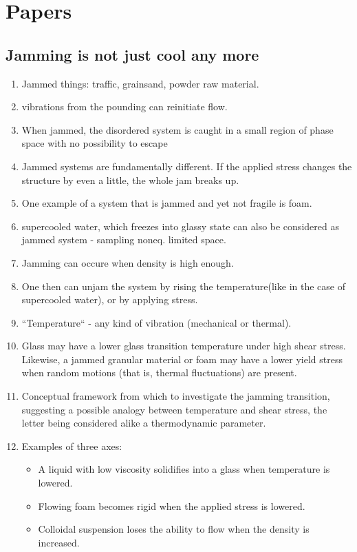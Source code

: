 \documentclass[10pt,a4paper]{article}
\begin{document}
\section{Papers}
\subsection{Jamming is not just cool any more\cite{nagel:98}}
\begin{enumerate}
 \item Jammed things: traffic, grainsand, powder raw material.
 \item vibrations from the pounding can reinitiate flow.
 \item When jammed, the disordered system is caught in a small region of phase space with no possibility to escape
 \item Jammed systems are fundamentally different. If the applied stress changes the structure by even a little, the whole jam breaks up. 
 \item One example of a system that is jammed and yet not fragile is foam.
 \item supercooled water, which freezes into glassy state can also be considered as jammed system - sampling noneq. limited space.
 \item Jamming can occure when density is high enough. 
 \item One then can unjam the system by rising the temperature(like in the case of supercooled water), or by applying stress. 
 \item ``Temperature`` - any kind of vibration (mechanical or thermal).
 \item Glass may have a lower glass transition temperature under high shear stress. 
 Likewise, a jammed granular material or foam may have a lower yield stress when random motions (that is, thermal fluctuations) are present.
 \item Conceptual framework from which to investigate the jamming transition, 
 suggesting a possible analogy between temperature and shear stress, the letter being considered alike a thermodynamic parameter.
 \item Examples of three axes:
 \begin{itemize}
  \item A liquid with low viscosity solidifies into a glass when temperature is lowered.
  \item Flowing foam becomes rigid when the applied stress is lowered.
  \item Colloidal suspension loses the ability to flow when the density is increased. 
 \end{itemize}

\end{enumerate}
\end{document}
